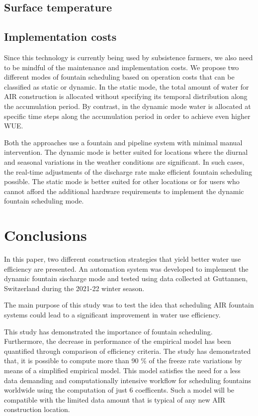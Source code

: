 \documentclass[utf8]{frontiersSCNS}
\begin{document}
\subsection{Surface temperature}

\subsection{Implementation costs}

Since this technology is currently being used by subsistence farmers, we also need to be mindful of the
maintenance and implementation costs. We propose two different modes of fountain scheduling based on operation
costs that can be classified as static or dynamic. In the static mode, the total amount of water
for AIR construction is allocated without specifying its temporal distribution along the accumulation period. By
contrast, in the dynamic mode water is allocated at specific time steps along the accumulation period in
order to achieve even higher WUE.

Both the approaches use a fountain and pipeline system with minimal manual intervention. The dynamic mode is
better suited for locations where the diurnal and seasonal variations in the weather conditions are significant.
In such cases, the real-time adjustments of the discharge rate make efficient fountain scheduling
possible. The static mode is better suited for other locations or for users who cannot afford the additional
hardware requirements to implement the dynamic fountain scheduling mode.

\section{Conclusions}


In this paper, two different construction strategies that yield better water use efficiency are presented.
An automation system was developed to implement the dynamic fountain sischarge mode and tested using data
collected at Guttannen, Switzerland during the 2021-22 winter season. 

The main purpose of this study was to test the idea that scheduling AIR fountain systems could lead to a
significant improvement in water use efficiency.

This study has demonstrated the importance of fountain scheduling. Furthermore, the decrease in performance of
the empirical model has been quantified through comparison of efficiency criteria. The study has demonstrated
that, it is possible to compute more than 90 \% of the freeze rate variations by means of a simplified empirical
model. This model satisfies the need for a less data demanding and computationally intensive workflow for
scheduling fountains worldwide using the computation of just 6 coefficents. Such a model will be compatible with
the limited data amount that is typical of any new AIR construction location.
\end{document}
